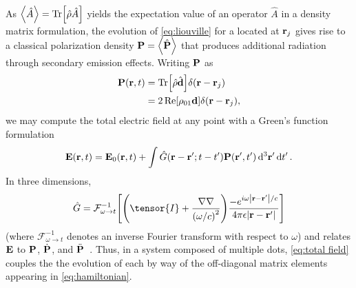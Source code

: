 As $\expval{\hat{A}} = \Tr[\hat{\rho}\hat{A}]$ yields the expectation value of an operator $\hat{A}$ in a density matrix formulation, the evolution of \cref{eq:liouville} for a \qd{} located at $\vb{r}_j$ gives rise to a classical polarization density $\vb{P} = \expval{\hat{\vb{P}}}$ that produces additional radiation through secondary emission effects.
Writing $\vb{P}$ as
\begin{equation}
  \begin{aligned}
    \vb{P}(\vb{r}, t) &= \Tr[\hat{\rho} \hat{\vb{d}}] \delta(\vb{r} - \vb{r}_j) \\
                      &= 2 \Re[\rho_{01}\vb{d}]\delta(\vb{r} - \vb{r}_j),
  \end{aligned}
\end{equation}
we may compute the total electric field at any point with a Green's function formulation
\begin{equation}
  \vb{E}(\vb{r}, t) = \vb{E}_0(\vb{r}, t) + \int \hat{G}(\vb{r} - \vb{r}'; t - t')\vb{P}(\vb{r}', t') \dd[3]{\vb{r}'} \dd{t'}.
  \label{eq:total field}
\end{equation}
In three dimensions,
\begin{equation}
  \hat{G} = \mathcal{F}_{\omega \to t}^{-1}\qty[ \qty(\tensor{I} + \frac{\nabla \nabla}{\qty(\omega/c)^2})\frac{-e^{i \omega \abs{\vb{r} - \vb{r}'}/c}}{4\pi \epsilon \abs{\vb{r} - \vb{r}'}} ]
  \label{eq:dyadic}
\end{equation}
(where $\mathcal{F}_{\omega \to t}^{-1}$ denotes an inverse Fourier transform with respect to $\omega$) and relates $\vb{E}$ to $\vb{P}$, $\dot{\vb{P}}$, and $\ddot{\vb{P}}$~\cite{Rothwell2009}.
Thus, in a system composed of multiple dots, \cref{eq:total field} couples the the evolution of each \qd{} by way of the off-diagonal matrix elements appearing in \cref{eq:hamiltonian}.

